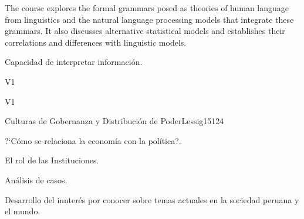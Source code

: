 \begin{syllabus}


\begin{justification}
The course explores the formal grammars posed as theories of human language from linguistics and the natural language processing models that integrate these grammars. It also discusses alternative statistical models and establishes their correlations and differences with linguistic models.
\end{justification}

\begin{goals}
\item Capacidad de interpretar información.
\end{goals}

\begin{outcomes}{V1}
    \item {}
    \item {}
    \item {}
    
\end{outcomes}

\begin{competences}{V1}
    \item {}
    \item {}
    \item {}
    \item {}
\end{competences}

\begin{unit}{Culturas de Gobernanza y Distribución de Poder}{}{Lessig15}{12}{4}
   \begin{topics}
      \item ?`Cómo se relaciona la economía con la política?.
      \item El rol de las Instituciones.
      \item Análisis de casos.
   \end{topics}
   \begin{learningoutcomes}
      \item Desarrollo del innterés por conocer sobre temas actuales en la sociedad peruana y el mundo.
   \end{learningoutcomes}
\end{unit}

\begin{coursebibliography}
\end{coursebibliography}

\end{syllabus}
